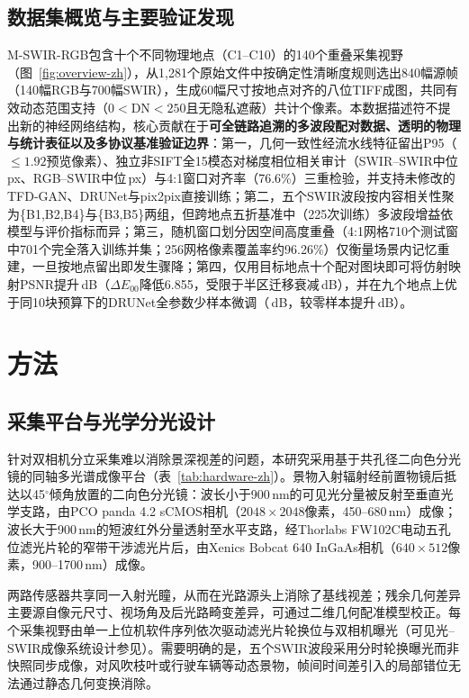 \documentclass[UTF8,a4paper,10pt]{ctexart}
\newcommand{\dE}{\ensuremath{\Delta E_{00}}}
\begin{document}
\subsection{数据集概览与主要验证发现}
M-SWIR-RGB包含十个不同物理地点（C1--C10）的140个重叠采集视野（图~\ref{fig:overview-zh}），从1{,}281个原始文件中按确定性清晰度规则选出840幅源帧（140幅RGB与700幅SWIR），生成60幅尺寸按地点对齐的八位TIFF成图，共同有效动态范围支持（$0<\mathrm{DN}<250$且无隐私遮蔽）共计\SupportPixelCount{}个像素。本数据描述符不提出新的神经网络结构，核心贡献在于\textbf{可全链路追溯的多波段配对数据、透明的物理与统计表征以及多协议基准验证边界}：第一，几何一致性经流水线特征留出P95（$\le 1.92$预览像素）、独立非SIFT全15模态对梯度相位相关审计（SWIR--SWIR中位\AuditSwirSwirMed\,px、RGB--SWIR中位\AuditRgbSwirMed\,px）与4:1窗口对齐率（76.6\%）三重检验，并支持未修改的TFD-GAN、DRUNet与pix2pix直接训练；第二，五个SWIR波段按内容相关性聚为\{B1,B2,B4\}与\{B3,B5\}两组，但跨地点五折基准中（225次训练）多波段增益依模型与评价指标而异；第三，随机窗口划分因空间高度重叠（4:1网格710个测试窗中701个完全落入训练并集；256网格像素覆盖率约96.26\%）仅衡量场景内记忆重建，一旦按地点留出即发生骤降；第四，仅用目标地点十个配对图块即可将仿射映射PSNR提升\CalibrationAffineGain\,dB（\dE{}降低6.855，受限于半区迁移衰减\HalfDrop\,dB），并在九个地点上优于同10块预算下的DRUNet全参数少样本微调（\TrackCDrFtPsnr\,dB，较零样本提升\TrackCDrFtGainZs\,dB）。

\section{方法}
\subsection{采集平台与光学分光设计}
针对双相机分立采集难以消除景深视差的问题，本研究采用基于共孔径二向色分光镜的同轴多光谱成像平台（表~\ref{tab:hardware-zh}）。景物入射辐射经前置物镜后抵达以45$^{\circ}$倾角放置的二向色分光镜：波长小于900\,nm的可见光分量被反射至垂直光学支路，由PCO panda 4.2 sCMOS相机（$2048\times2048$像素，450--680\,nm）成像；波长大于900\,nm的短波红外分量透射至水平支路，经Thorlabs FW102C电动五孔位滤光片轮的窄带干涉滤光片后，由Xenics Bobcat 640 InGaAs相机（$640\times512$像素，900--1700\,nm\cite{rogalski2003}）成像。

两路传感器共享同一入射光瞳，从而在光路源头上消除了基线视差；残余几何差异主要源自像元尺寸、视场角及后光路畸变差异，可通过二维几何配准模型校正\cite{zitova2003}。每个采集视野由单一上位机软件序列依次驱动滤光片轮换位与双相机曝光（可见光--SWIR成像系统设计参见\cite{yu2024}）。需要明确的是，五个SWIR波段采用分时轮换曝光而非快照同步成像，对风吹枝叶或行驶车辆等动态景物，帧间时间差引入的局部错位无法通过静态几何变换消除。
\end{document}
